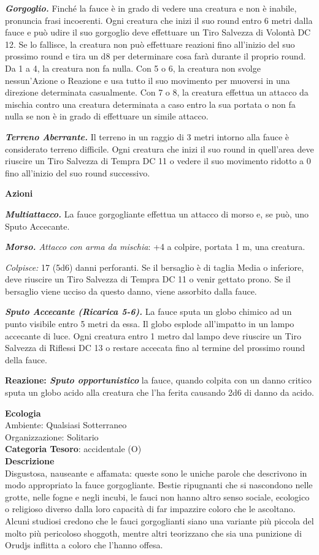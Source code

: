 \begin{multicols}{2}
{\emph{\textbf{Gorgoglio.}} Finché la fauce è in grado di vedere una creatura e non è inabile, pronuncia frasi incoerenti. Ogni creatura che inizi il suo round entro 6 metri dalla fauce e può udire il suo gorgoglio deve effettuare un Tiro Salvezza di Volontà DC 12. Se lo fallisce, la creatura non può effettuare reazioni fino all'inizio del suo prossimo round e tira un d8 per determinare cosa farà durante il proprio round. Da 1 a 4, la creatura non fa nulla. Con 5 o 6, la creatura non svolge nessun'Azione o Reazione e usa tutto il suo movimento per muoversi in una direzione determinata casualmente. Con 7 o 8, la creatura effettua un attacco da mischia contro una creatura determinata a caso entro la sua portata o non fa nulla se non è in grado di effettuare un simile attacco.

\emph{\textbf{Terreno Aberrante.}} Il terreno in un raggio di 3 metri intorno alla fauce è considerato terreno difficile. Ogni creatura che inizi il suo round in quell'area deve riuscire un Tiro Salvezza di Tempra DC 11 o vedere il suo movimento ridotto a 0 fino all'inizio del suo round successivo.

\textbf{Azioni}

\emph{\textbf{Multiattacco.}} La fauce gorgogliante effettua un attacco di morso e, se può, uno Sputo Accecante.

\emph{\textbf{Morso.} Attacco con arma da mischia}: +4 a colpire, portata 1 m, una creatura.

\emph{Colpisce:} 17 (5d6) danni perforanti. Se il bersaglio è di taglia Media o inferiore, deve riuscire un Tiro Salvezza di Tempra DC 11 o venir gettato prono. Se il bersaglio viene ucciso da questo danno, viene assorbito dalla fauce.

\emph{\textbf{Sputo Accecante (Ricarica 5-6).}} La fauce sputa un globo chimico ad un punto visibile entro 5 metri da essa. Il globo esplode all'impatto in un lampo accecante di luce. Ogni creatura entro 1 metro dal lampo deve riuscire un Tiro Salvezza di Riflessi DC 13 o restare accecata fino al termine del prossimo round della fauce.

\textbf{Reazione: \emph{Sputo opportunistico}} la fauce, quando colpita con un danno critico sputa un globo acido alla creatura che l'ha ferita causando 2d6 di danno da acido.

\textbf{Ecologia}\\
Ambiente: Qualsiasi Sotterraneo\\
Organizzazione: Solitario\\
\textbf{Categoria Tesoro}: accidentale (O)\\
\textbf{Descrizione}\\
Disgustosa, nauseante e affamata: queste sono le uniche parole che descrivono in modo appropriato la fauce gorgogliante. Bestie ripugnanti che si nascondono nelle grotte, nelle fogne e negli incubi, le fauci non hanno altro senso sociale, ecologico o religioso diverso dalla loro capacità di far impazzire coloro che le ascoltano. Alcuni studiosi credono che le fauci gorgoglianti siano una variante più piccola del molto più pericoloso shoggoth, mentre altri teorizzano che sia una punizione di Orudjs inflitta a coloro che l'hanno offesa.

}
\end{multicols}
